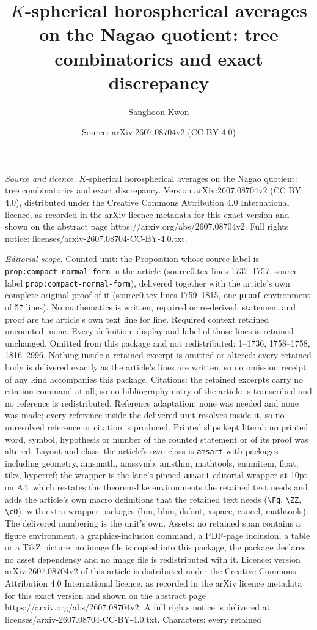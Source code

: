 \documentclass[10pt,a4paper]{amsart}
\title[$K$-spherical horospherical averages on the Nagao quotient: ]{$K$-spherical horospherical averages on the Nagao quotient: tree combinatorics and exact discrepancy}
\author{Sanghoon Kwon}
\date{Source: arXiv:2607.08704v2 (CC BY 4.0)}
\begin{document}
\maketitle

\noindent\emph{Source and licence.} $K$-spherical horospherical averages on the Nagao quotient: tree combinatorics and exact discrepancy. Version arXiv:2607.08704v2 (CC BY 4.0), distributed under the Creative Commons Attribution 4.0 International licence, as recorded in the arXiv licence metadata for this exact version and shown on the abstract page https://arxiv.org/abs/2607.08704v2. Full rights notice: licenses/arxiv-2607.08704-CC-BY-4.0.txt.\par\smallskip

\noindent\textit{Editorial scope.} Counted unit: the Proposition whose source label is \texttt{prop:compact-normal-form} in the article (source0.tex lines 1737--1757, source label \texttt{prop:compact-normal-form}), delivered together with the article's own complete original proof of it (source0.tex lines 1759--1815, one \texttt{proof} environment of 57 lines). No mathematics is written, repaired or re-derived: statement and proof are the article's own text line for line. Required context retained uncounted: none. Every definition, display and label of those lines is retained unchanged. Omitted from this package and not redistributed: 1--1736, 1758--1758, 1816--2996. Nothing inside a retained excerpt is omitted or altered: every retained body is delivered exactly as the article's lines are written, so no omission receipt of any kind accompanies this package. Citations: the retained excerpts carry no citation command at all, so no bibliography entry of the article is transcribed and no reference is redistributed. Reference adaptation: none was needed and none was made; every reference inside the delivered unit resolves inside it, so no unresolved reference or citation is produced. Printed slips kept literal: no printed word, symbol, hypothesis or number of the counted statement or of its proof was altered. Layout and class: the article's own class is \texttt{amsart} with packages including geometry, amsmath, amssymb, amsthm, mathtools, enumitem, float, tikz, hyperref; the wrapper is the lane's pinned \texttt{amsart} editorial wrapper at 10pt on A4, which restates the theorem-like environments the retained text needs and adds the article's own macro definitions that the retained text needs (\texttt{\textbackslash Fq}, \texttt{\textbackslash ZZ}, \texttt{\textbackslash cO}), with extra wrapper packages (bm, bbm, dsfont, xspace, cancel, mathtools). The delivered numbering is the unit's own. Assets: no retained span contains a figure environment, a graphics-inclusion command, a PDF-page inclusion, a table or a TikZ picture; no image file is copied into this package, the package declares no asset dependency and no image file is redistributed with it. Licence: version arXiv:2607.08704v2 of this article is distributed under the Creative Commons Attribution 4.0 International licence, as recorded in the arXiv licence metadata for this exact version and shown on the abstract page https://arxiv.org/abs/2607.08704v2. A full rights notice is delivered at licenses/arxiv-2607.08704-CC-BY-4.0.txt. Characters: every retained 
\end{document}
